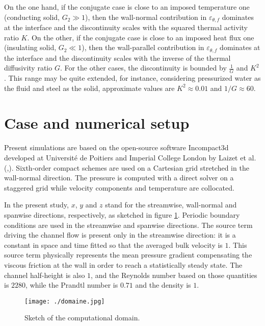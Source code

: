 \documentclass[review]{elsarticle}
\begin{document}
On the one hand, if the conjugate case is close to an imposed temperature one (conducting solid, $G_2 \gg 1$), then the wall-normal contribution in $\varepsilon_{\theta,f}$ dominates at the interface and the discontinuity scales with the squared thermal activity ratio $K$.
On the other, if the conjugate case is close to an imposed heat flux one (insulating solid, $G_2 \ll 1$), then the wall-parallel contribution in $\varepsilon_{\theta,f}$ dominates at the interface and the discontinuity scales with the inverse of the thermal diffusivity ratio $G$.
For the other cases, the discontinuity is bounded by $\frac{1}{G}$ and $K^2$.
This range may be quite extended, for instance, considering pressurized water as the fluid and steel as the solid, approximate values are $K^2 \approx 0.01$ and $1/G \approx 60$.

\section{Case and numerical setup}
Present simulations are based on the open-source software Incompact3d developed at Universit\'e de Poitiers  and  Imperial  College  London by Laizet et al. (\cite{LaizetJCP2009},\cite{LaizetLi2011}).
Sixth-order compact schemes are used on a Cartesian grid stretched in the wall-normal direction.
The pressure is computed with a direct solver on a staggered grid while velocity components and temperature are collocated.

In the present study, $x$, $y$ and $z$ stand for the streamwise, wall-normal and spanwise directions, respectively, as sketched in figure \ref{fig-sketch}.
{\color{red} Periodic boundary conditions are used in the streamwise and spanwise directions.}
The source term driving the channel flow is present only in the streamwise direction: it is a constant in space and time fitted so that the averaged bulk velocity is $1$.
{\color{red} This source term physically represents the mean pressure gradient compensating the viscous friction at the wall in order to reach a statistically steady state.}
The channel half-height is also $1$, and the Reynolds number based on those quantities is $2280$, while the Prandtl number is $0.71$ and the density is $1$.

\begin{figure}[htbp]
\centering
\texttt{[image: ./domaine.jpg]}
\caption{Sketch of the computational domain.}
\label{fig-sketch}
\end{figure}
\end{document}
